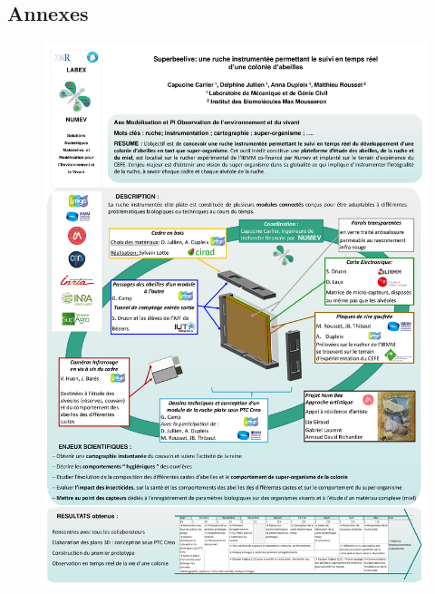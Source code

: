\documentclass[11pt,french,a4paper]{report}
\begin{document}
\begin{appendix} 
\chapter{Annexes}
        \begin{figure}[t]
            \includegraphics[scale=0.7]{../images/annexes/poster_numev.pdf}
        \end{figure}
\end{appendix}
\end{document}
